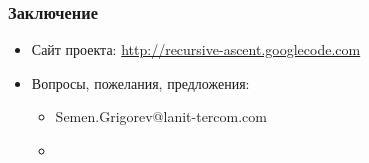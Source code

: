\documentclass{beamer}
\begin{document}
\author[Григорьев Семён]{}

\begin{frame}
	\transwipe[direction=90]
	\frametitle{Заключение}
	\begin{itemize}
        \item Сайт проекта: \href{http://recursive-ascent.googlecode.com} {http://recursive-ascent.googlecode.com}
	    \item Вопросы, пожелания, предложения:
	        \begin{itemize}
	            \item Semen.Grigorev@lanit-tercom.com
	            \item 
            \end{itemize} 
    \end{itemize}
\end{frame}
\end{document}
